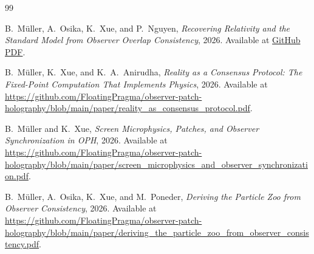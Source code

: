 \begin{thebibliography}{99}

B.~M\"uller, A.~Osika, K.~Xue, and P.~Nguyen,
\emph{Recovering Relativity and the Standard Model from Observer Overlap Consistency},
2026.
Available at \href{https://github.com/FloatingPragma/observer-patch-holography/blob/main/paper/recovering_relativity_and_standard_model_structure_from_observer_overlap_consistency_compact.pdf}{GitHub PDF}.

B.~M\"uller, K.~Xue, and K.~A.~Anirudha,
\emph{Reality as a Consensus Protocol: The Fixed-Point Computation That Implements Physics},
2026.
Available at \url{https://github.com/FloatingPragma/observer-patch-holography/blob/main/paper/reality_as_consensus_protocol.pdf}.

B.~M\"uller and K.~Xue,
\emph{Screen Microphysics, Patches, and Observer Synchronization in OPH},
2026.
Available at \url{https://github.com/FloatingPragma/observer-patch-holography/blob/main/paper/screen_microphysics_and_observer_synchronization.pdf}.

B.~M\"uller, A.~Osika, K.~Xue, and M.~Poneder,
\emph{Deriving the Particle Zoo from Observer Consistency},
2026.
Available at \url{https://github.com/FloatingPragma/observer-patch-holography/blob/main/paper/deriving_the_particle_zoo_from_observer_consistency.pdf}.



\end{thebibliography}

